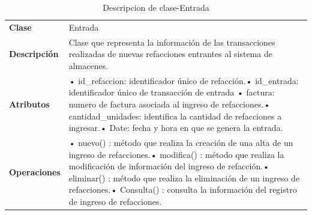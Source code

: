 \begin{table}[H]
	\centering
	\caption{Descripcion de clase-Entrada}
	\begin{tabular}{|p{6.145em}|p{28.07em}|}
		\toprule
		\rowcolor[rgb]{ .125,  .216,  .392} \multicolumn{2}{|p{34.215em}|}{\textcolor[rgb]{ 1,  1,  1}{\textbf{Clase Entrada }}} \\
		\midrule
		\textbf{Clase} & \multicolumn{1}{l|}{Entrada } \\
		\midrule
		\textbf{Descripción} & Clase que representa la información de las transacciones realizadas de nuevas refacciones entrantes al sistema de almacenes.  \\
		\midrule
		\textbf{Atributos } & •	id\_refaccion: identificador único de refacción.\newline{}•	id\_entrada: identificador único de transacción de entrada \newline{}•	factura: numero de factura asociada al ingreso de refacciones.\newline{}•	cantidad\_unidades: identifica la cantidad de refacciones a ingresar.\newline{}•	Date: fecha y hora en que se genera la entrada. \\
		\midrule
		\textbf{Operaciones} & •	nuevo()  :  método que realiza la creación de una alta de un ingreso de  refacciones.\newline{}•	modifica() : método que  realiza la modificación de información del ingreso de refacción.\newline{}•	eliminar() : método que realiza la eliminación de un ingreso de refacciones.\newline{}•	Consulta() : consulta la información del registro de ingreso de refacciones. \\
		\bottomrule
	\end{tabular}%
	\label{tab:class16}%
\end{table}%


